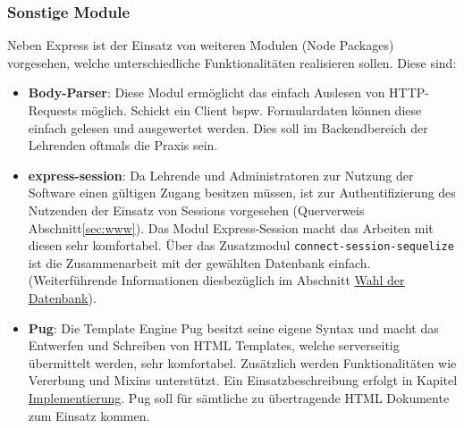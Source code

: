 \subsubsection{Sonstige Module}
Neben Express ist der Einsatz von weiteren Modulen (Node Packages) vorgesehen, welche unterschiedliche Funktionalitäten realisieren sollen. Diese sind:
\begin{itemize}
	\item \textbf{Body-Parser}: Diese Modul ermöglicht das einfach Auslesen von HTTP-Requests möglich. Schickt ein Client bspw. Formulardaten können diese einfach gelesen und ausgewertet werden. Dies soll im Backendbereich der Lehrenden oftmals die Praxis sein.
	\item \textbf{express-session}: Da Lehrende und Administratoren zur Nutzung der Software einen gültigen Zugang besitzen müssen, ist zur Authentifizierung des Nutzenden der Einsatz von Sessions vorgesehen (Querverweis Abschnitt\ref{sec:www}). Das Modul Express-Session macht das Arbeiten mit diesen sehr komfortabel. Über das Zusatzmodul \texttt{connect-session-sequelize} ist die Zusammenarbeit mit der gewählten Datenbank einfach. (Weiterführende Informationen diesbezüglich im Abschnitt  \hyperref[sec:datenbank]{Wahl der Datenbank}). 
	\item \textbf{Pug}: Die Template Engine Pug besitzt seine eigene Syntax und macht das Entwerfen und Schreiben von HTML Templates, welche serverseitig übermittelt werden, sehr komfortabel. Zusätzlich werden Funktionalitäten wie Vererbung und Mixins unterstützt. Ein Einsatzbeschreibung erfolgt in Kapitel \hyperref[sec:implementierung]{Implementierung}. Pug soll für sämtliche zu übertragende HTML Dokumente zum Einsatz kommen.   
\end{itemize}
